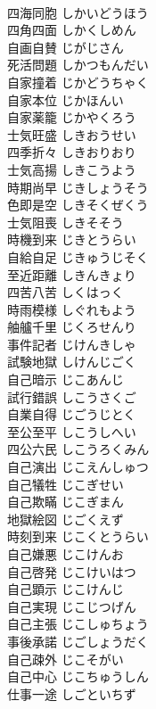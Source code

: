 \documentclass[8pt]{extreport}
\begin{document}
\begin{CJK}{UTF8}{min}
\\	四海同胞	しかいどうほう	
\\	四角四面	しかくしめん	
\\	自画自賛	じがじさん	
\\	死活問題	しかつもんだい	
\\	自家撞着	じかどうちゃく	
\\	自家本位	じかほんい	
\\	自家薬籠	じかやくろう	
\\	士気旺盛	しきおうせい	
\\	四季折々	しきおりおり	
\\	士気高揚	しきこうよう	
\\	時期尚早	じきしょうそう	
\\	色即是空	しきそくぜくう	
\\	士気阻喪	しきそそう	
\\	時機到来	じきとうらい	
\\	自給自足	じきゅうじそく	
\\	至近距離	しきんきょり	
\\	四苦八苦	しくはっく	
\\	時雨模様	しぐれもよう	
\\	舳艫千里	じくろせんり	
\\	事件記者	じけんきしゃ	
\\	試験地獄	しけんじごく	
\\	自己暗示	じこあんじ	
\\	試行錯誤	しこうさくご	
\\	自業自得	じごうじとく	
\\	至公至平	しこうしへい	
\\	四公六民	しこうろくみん	
\\	自己演出	じこえんしゅつ	
\\	自己犠牲	じこぎせい	
\\	自己欺瞞	じこぎまん	
\\	地獄絵図	じごくえず	
\\	時刻到来	じこくとうらい	
\\	自己嫌悪	じこけんお	
\\	自己啓発	じこけいはつ	
\\	自己顕示	じこけんじ	
\\	自己実現	じこじつげん	
\\	自己主張	じこしゅちょう	
\\	事後承諾	じごしょうだく	
\\	自己疎外	じこそがい	
\\	自己中心	じこちゅうしん	
\\	仕事一途	しごといちず	

\end{CJK}
\end{document}
